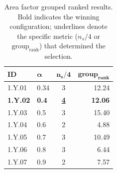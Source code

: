 \begin{table}[!t]
\centering
\footnotesize
\caption{Area factor grouped ranked results. Bold indicates the winning configuration; underlines denote the specific metric ($n_s/4$ or $\text{group}_{\text{rank}}$) that determined the selection.}
\label{tab:area_grouped_ranked}
\begin{tabular}{@{}llcr@{}}
\hline
    \textbf{ID} & $\bm{\alpha}$ & $\bm{n_s/4}$ & $\bm{\text{group}_{\text{rank}}}$ \\
\hline
    1.Y.01 & 0.34 & 3 & 12.24 \\
    \textbf{1.Y.02} & \textbf{0.4} & \textbf{\underline{4}} & \textbf{12.06} \\
    1.Y.03 & 0.5 & 3 & 15.40 \\
    1.Y.04 & 0.6 & 2 & 4.88 \\
    1.Y.05 & 0.7 & 3 & 10.49 \\
    1.Y.06 & 0.8 & 3 & 6.44 \\
    1.Y.07 & 0.9 & 2 & 7.57 \\
\hline
\end{tabular}
\end{table}